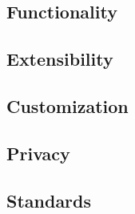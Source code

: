     \subsection{Functionality}

    \subsection{Extensibility}

    \subsection{Customization}

    \subsection{Privacy}\label{2_privacy}

    \subsection{Standards}